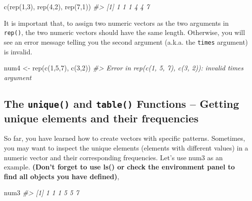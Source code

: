 \documentclass[
]{book}
\newenvironment{Shaded}{\begin{snugshade}}{\end{snugshade}}
\newcommand{\CommentTok}[1]{\textcolor[rgb]{0.56,0.35,0.01}{\textit{#1}}}
\newcommand{\DecValTok}[1]{\textcolor[rgb]{0.00,0.00,0.81}{#1}}
\newcommand{\FunctionTok}[1]{\textcolor[rgb]{0.00,0.00,0.00}{#1}}
\newcommand{\NormalTok}[1]{#1}
\newcommand{\OtherTok}[1]{\textcolor[rgb]{0.56,0.35,0.01}{#1}}
\begin{document}
\begin{Shaded}
\begin{Highlighting}[]
\FunctionTok{c}\NormalTok{(}\FunctionTok{rep}\NormalTok{(}\DecValTok{1}\NormalTok{,}\DecValTok{3}\NormalTok{), }\FunctionTok{rep}\NormalTok{(}\DecValTok{4}\NormalTok{,}\DecValTok{2}\NormalTok{), }\FunctionTok{rep}\NormalTok{(}\DecValTok{7}\NormalTok{,}\DecValTok{1}\NormalTok{))}
\CommentTok{\#\textgreater{} [1] 1 1 1 4 4 7}
\end{Highlighting}
\end{Shaded}

It is important that, to assign two numeric vectors as the two arguments in \texttt{rep()}, the two numeric vectors should have the same length. Otherwise, you will see an error message telling you the second argument (a.k.a. the \texttt{times} argument) is invalid.

\begin{Shaded}
\begin{Highlighting}[]
\NormalTok{num4 }\OtherTok{\textless{}{-}} \FunctionTok{rep}\NormalTok{(}\FunctionTok{c}\NormalTok{(}\DecValTok{1}\NormalTok{,}\DecValTok{5}\NormalTok{,}\DecValTok{7}\NormalTok{), }\FunctionTok{c}\NormalTok{(}\DecValTok{3}\NormalTok{,}\DecValTok{2}\NormalTok{))}
\CommentTok{\#\textgreater{} Error in rep(c(1, 5, 7), c(3, 2)): invalid \textquotesingle{}times\textquotesingle{} argument}
\end{Highlighting}
\end{Shaded}

\hypertarget{the-unique-and-table-functions-getting-unique-elements-and-their-frequencies}{%
\subsection{\texorpdfstring{The \texttt{unique()} and \texttt{table()} Functions -- Getting unique elements and their frequencies}{The unique() and table() Functions -- Getting unique elements and their frequencies}}\label{the-unique-and-table-functions-getting-unique-elements-and-their-frequencies}}

So far, you have learned how to create vectors with specific patterns. Sometimes, you may want to inspect the unique elements (elements with different values) in a numeric vector and their corresponding frequencies. Let's use num3 as an example. \textbf{(Don't forget to use ls() or check the environment panel to find all objects you have defined)},

\begin{Shaded}
\begin{Highlighting}[]
\NormalTok{num3}
\CommentTok{\#\textgreater{} [1] 1 1 1 5 5 7}
\end{Highlighting}
\end{Shaded}
\end{document}
